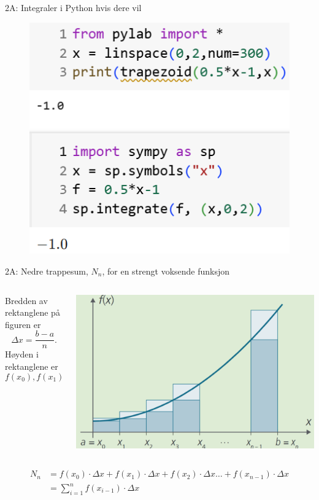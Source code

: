 \greenheader
\begin{frame}[fragile]{2A: Integraler i Python hvis dere vil}
    \warn
\begin{figure}
    \centering
    \includegraphics[width=0.5\linewidth]{R2-K2A-14.png}
\end{figure}
\end{frame}


\greenheader
\begin{frame}{2A: Nedre trappesum, $N_n$,  for en strengt voksende funksjon}
    \begin{columns} 
        \begin{column}{0.42\textwidth}
            Bredden av rektanglene på figuren er 
            \[
                \Delta x = \frac{b-a}{n}.
            \]
            Høyden i rektanglene er 
            \[
                f(x_0), f(x_1), f(x_2), \dots, f(x_{n-1}).
            \]
           
            
        \end{column}
        \begin{column}{0.58\textwidth}
            \centering
            \includegraphics[width=1\linewidth]{R2-K2A-15.png}
        \end{column}
    \end{columns}
    \begin{align*}
                 N_n &=  
                 f(x_0)\cdot \Delta x + f(x_1)\cdot \Delta x + f(x_2)\cdot \Delta x \dots + f(x_{n-1})\cdot \Delta x\\
                &=  \sum_{i=1}^{n} f(x_{i-1})\cdot \Delta x
            \end{align*}
\end{frame}

